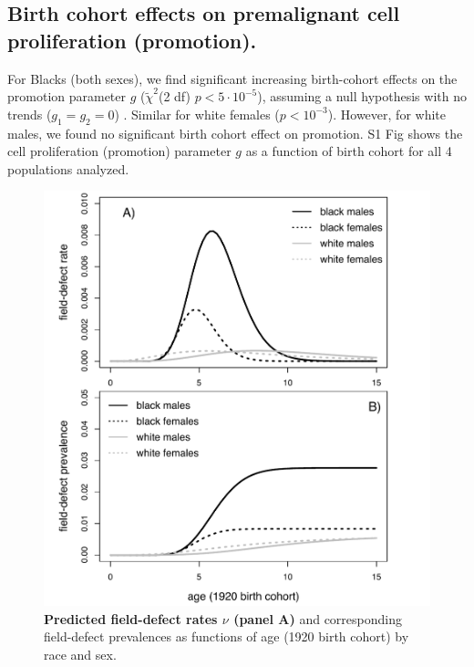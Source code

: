 \documentclass[10pt,letterpaper]{article}
\begin{document}
\subsection*{Birth cohort effects on premalignant cell proliferation (promotion).}
For Blacks (both sexes), we find significant increasing birth-cohort effects on the promotion parameter $g$ ($\tilde{\chi}^2$(2 df) $p<5\cdot 10^{-5}$), assuming a null hypothesis with no trends ($g_1=g_2=0$) . Similar for white females ($p< 10^{-3}$). However, for white males, we found no significant birth cohort effect on promotion. S1 Fig shows the cell proliferation (promotion) parameter $g$ as a function of birth cohort for all 4 populations analyzed.

\medskip
\begin{figure}[t]
\includegraphics[scale=0.7, trim=0 0 0 0]{Fig6.pdf}
\caption{{\bf Predicted field-defect rates $\nu$ (panel A)} and corresponding field-defect prevalences as functions of age (1920 birth cohort) by race and sex.}
\label{fig6}
\end{figure}
\end{document}
